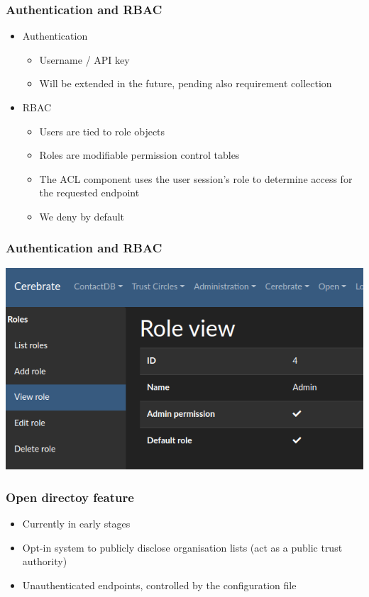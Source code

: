 \begin{frame}
	\frametitle{Authentication and RBAC}
	\begin{itemize}
            \item Authentication
            \begin{itemize}
		\item Username / API key
                \item Will be extended in the future, pending also requirement collection
            \end{itemize}
            \item RBAC
            \begin{itemize}
		\item Users are tied to role objects
                \item Roles are modifiable permission control tables
                \item The ACL component uses the user session's role to determine access for the requested endpoint
                \item We deny by default
            \end{itemize}
	\end{itemize}
\end{frame}

\begin{frame}
\frametitle{Authentication and RBAC}
\begin{center}
    \includegraphics[scale=0.5]{roles.png}
\end{center}
\end{frame}

\begin{frame}
	\frametitle{Open directoy feature}
	\begin{itemize}
		\item Currently in early stages
                \item Opt-in system to publicly disclose organisation lists (act as a public trust authority)
                \item Unauthenticated endpoints, controlled by the configuration file
	\end{itemize}
\end{frame}

